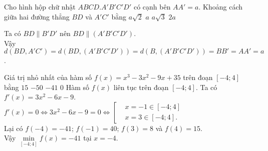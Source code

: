 \begin{ex}%
 \immini
 {
 Cho hình hộp chữ nhật $ABCD.A'B'C'D'$ có cạnh bên $AA' = a$. Khoảng cách giữa hai đường thẳng $BD$ và $A'C'$ bằng
 \choice
  {$a\sqrt{2}$}
  {\True $a$}
  {$a\sqrt{3}$}
  {$2a$}
 }
 {
 }
 \loigiai
  {
  Ta có $BD \parallel B'D'$ nên $BD \parallel (A'B'C'D')$.\\
  Vậy $d(BD,A'C') = d(BD,(A'B'C'D')) = d(B,(A'B'C'D')) = BB' = AA' = a$.
  }
\end{ex}


\begin{ex}%
 Giá trị nhỏ nhất của hàm số $f(x)=x^3-3x^2-9x+35$ trên đoạn $[-4;4]$ bằng
 \choice
  {$15$}
  {$-50$}
  {\True $-41$}
  {$0$}
 \loigiai
  {
  Hàm số $f(x)$ liên tục trên đoạn $[-4;4]$. Ta có $f'(x) = 3x^2 - 6x - 9$.\\
  $f'(x) = 0 \Leftrightarrow 3x^2 - 6x - 9 = 0 \Leftrightarrow \left[\begin{aligned} & x=-1 \in [-4;4] \\& x=3 \in [-4;4]. \end{aligned}\right.$\\
  Lại có $f(-4)=-41$; $f(-1)=40$; $f(3)=8$ và $f(4)=15$.\\
  Vậy $\min\limits_{[-4;4]} f(x) = -41$ tại $x=-4$.
  }
\end{ex}


